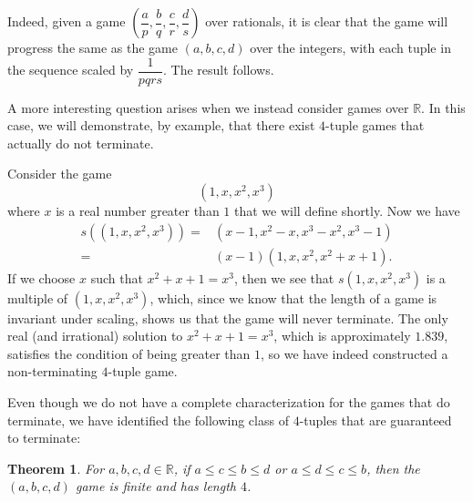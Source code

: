 \documentclass[12pt]{amsart}
\newtheorem{theorem}{Theorem}[section]
\newcommand{\diff}{s}
\begin{document}
Indeed, given a game $\left(\dfrac{a}{p}, \dfrac{b}{q}, \dfrac{c}{r}, \dfrac{d}{s}\right)$ over rationals, it is clear that the game will progress the same as the game $(a, b, c, d)$ over the integers, with each tuple in the sequence scaled by $\dfrac{1}{pqrs}$. The result follows.

A more interesting question arises when we instead consider games over $\mathbb{R}$. In this case, we will demonstrate, by example, that there exist $4$-tuple games that actually do not terminate.

Consider the game
$$
(1,x,x^2,x^3)
$$
where $x$ is a real number greater than $1$ that we will define shortly. Now we have
\begin{align*}
\diff((1,x,x^2,x^3))
= & (x-1, x^2 - x, x^3 - x^2, x^3 - 1) \\
= & (x-1) (1, x, x^2, x^2 + x + 1).
\end{align*}
If we choose $x$ such that $x^2 + x + 1 = x^3$, then we see that $s(1,x,x^2,x^3)$ is a multiple of $(1,x,x^2,x^3)$, which, since we know that the length of a game is invariant under scaling, shows us that the game will never terminate. The only real (and irrational) solution to $x^2 + x + 1 = x^3$, which is approximately $1.839$, satisfies the condition of being greater than $1$, so we have indeed constructed a non-terminating $4$-tuple game.

Even though we do not have a complete characterization for the games that do terminate, we have identified the following class of $4$-tuples that are guaranteed to terminate:

\begin{theorem}
\label{thm:inequalities}
For $a,b,c,d\in \mathbb{R}$, if $a \leq c \leq b \leq d$ or $a \leq d \leq c \leq b$, then the $(a,b,c,d)$ game is finite and has length $4$. 
\end{theorem}
\end{document}
